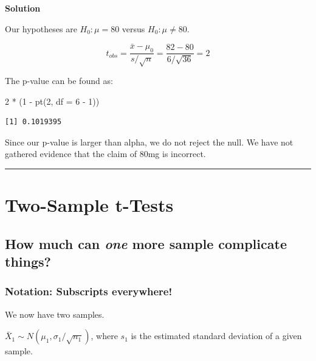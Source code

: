 \documentclass[
  letterpaper,
  DIV=11,
  numbers=noendperiod,
  oneside]{scrreprt}
\newenvironment{Shaded}{\begin{snugshade}}{\end{snugshade}}
\newcommand{\AttributeTok}[1]{\textcolor[rgb]{0.40,0.45,0.13}{#1}}
\newcommand{\DecValTok}[1]{\textcolor[rgb]{0.68,0.00,0.00}{#1}}
\newcommand{\FunctionTok}[1]{\textcolor[rgb]{0.28,0.35,0.67}{#1}}
\newcommand{\NormalTok}[1]{\textcolor[rgb]{0.00,0.23,0.31}{#1}}
\newcommand{\SpecialCharTok}[1]{\textcolor[rgb]{0.37,0.37,0.37}{#1}}
\begin{document}
\textbf{Solution}

Our hypotheses are \(H_0:\mu = 80\) versus \(H_0:\mu \ne 80\).

\[
t_{obs} = \frac{\bar x - \mu_0}{s/\sqrt{n}} = \frac{82 - 80}{6 / \sqrt{36}} = 2
\]

The p-value can be found as:

\begin{Shaded}
\begin{Highlighting}[]
\DecValTok{2} \SpecialCharTok{*}\NormalTok{ (}\DecValTok{1} \SpecialCharTok{{-}} \FunctionTok{pt}\NormalTok{(}\DecValTok{2}\NormalTok{, }\AttributeTok{df =} \DecValTok{6} \SpecialCharTok{{-}} \DecValTok{1}\NormalTok{))}
\end{Highlighting}
\end{Shaded}

\begin{verbatim}
[1] 0.1019395
\end{verbatim}

Since our p-value is larger than alpha, we do not reject the null. We
have not gathered evidence that the claim of 80mg is incorrect.

\begin{center}\rule{0.5\linewidth}{0.5pt}\end{center}

\hypertarget{two-sample-t-tests}{%
\chapter{Two-Sample t-Tests}\label{two-sample-t-tests}}

\hypertarget{how-much-can-one-more-sample-complicate-things}{%
\section{\texorpdfstring{How much can \emph{one} more sample complicate
things?}{How much can one more sample complicate things?}}\label{how-much-can-one-more-sample-complicate-things}}

\hypertarget{notation-subscripts-everywhere}{%
\subsection{Notation: Subscripts
everywhere!}\label{notation-subscripts-everywhere}}

We now have two samples.

\(\bar X_1\sim N(\mu_1, \sigma_1/\sqrt{n_1})\), where \(s_1\) is the
estimated standard deviation of a given sample.
\end{document}
